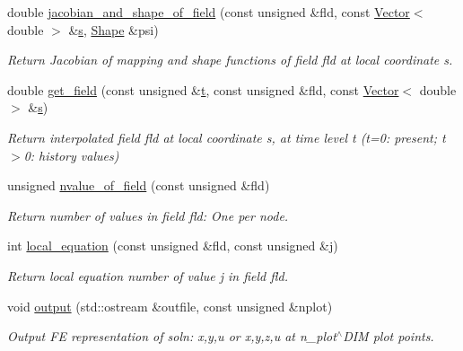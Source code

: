 \begin{DoxyCompactItemize}
double \hyperlink{classoomph_1_1ProjectableHelmholtzElement_a651580abfd2d133f7cd6cd38e0bcca61}{jacobian\+\_\+and\+\_\+shape\+\_\+of\+\_\+field} (const unsigned \&fld, const \hyperlink{classoomph_1_1Vector}{Vector}$<$ double $>$ \&\hyperlink{cfortran_8h_ab7123126e4885ef647dd9c6e3807a21c}{s}, \hyperlink{classoomph_1_1Shape}{Shape} \&psi)
\begin{DoxyCompactList}\small\item\em Return Jacobian of mapping and shape functions of field fld at local coordinate s. \end{DoxyCompactList}\item 
double \hyperlink{classoomph_1_1ProjectableHelmholtzElement_a6635aa1b760348ac92784c4e7bb6db38}{get\+\_\+field} (const unsigned \&\hyperlink{cfortran_8h_af6f0bd3dc13317f895c91323c25c2b8f}{t}, const unsigned \&fld, const \hyperlink{classoomph_1_1Vector}{Vector}$<$ double $>$ \&\hyperlink{cfortran_8h_ab7123126e4885ef647dd9c6e3807a21c}{s})
\begin{DoxyCompactList}\small\item\em Return interpolated field fld at local coordinate s, at time level t (t=0\+: present; t$>$0\+: history values) \end{DoxyCompactList}\item 
unsigned \hyperlink{classoomph_1_1ProjectableHelmholtzElement_abcab89ec5baac0407527579afc8aac15}{nvalue\+\_\+of\+\_\+field} (const unsigned \&fld)
\begin{DoxyCompactList}\small\item\em Return number of values in field fld\+: One per node. \end{DoxyCompactList}\item 
int \hyperlink{classoomph_1_1ProjectableHelmholtzElement_ada5e8cc58f2c0be72da7b66e07d174be}{local\+\_\+equation} (const unsigned \&fld, const unsigned \&j)
\begin{DoxyCompactList}\small\item\em Return local equation number of value j in field fld. \end{DoxyCompactList}\item 
void \hyperlink{classoomph_1_1ProjectableHelmholtzElement_ab7b86d1f7ae0c54e512ebf0816dab665}{output} (std\+::ostream \&outfile, const unsigned \&nplot)
\begin{DoxyCompactList}\small\item\em Output FE representation of soln\+: x,y,u or x,y,z,u at n\+\_\+plot$^\wedge$\+D\+IM plot points. \end{DoxyCompactList}\end{DoxyCompactItemize}
